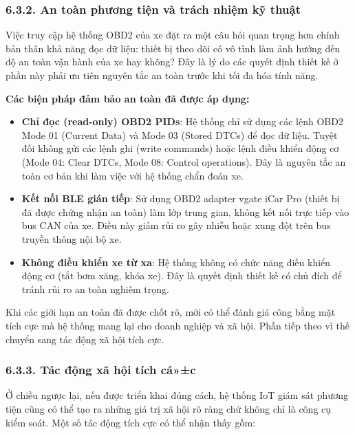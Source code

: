 \documentclass[a4paper]{extarticle}
\providecommand{\tightlist}{%
  \setlength{\itemsep}{0pt}\setlength{\parskip}{0pt}}
\begin{document}
\subsubsection{6.3.2. An toàn phương tiện và trách nhiệm kỹ
thuật}\label{632-an-touxe0n-phux1b0ux1a1ng-tiux1ec7n-vuxe0-truxe1ch-nhiux1ec7m-kux1ef9-thuux1eadt}

Việc truy cập hệ thống OBD2 của xe đặt ra một câu hỏi quan trọng hơn
chính bản thân khả năng đọc dữ liệu: thiết bị theo dõi có vô tình làm
ảnh hưởng đến độ an toàn vận hành của xe hay không? Đây là lý do các
quyết định thiết kế ở phần này phải ưu tiên nguyên tắc an toàn trước khi
tối đa hóa tính năng.

\textbf{Các biện pháp đảm bảo an toàn đã được áp dụng:}

\begin{itemize}
\tightlist
\item
  \textbf{Chỉ đọc (read-only) OBD2 PIDs}: Hệ thống chỉ sử dụng các lệnh
  OBD2 Mode 01 (Current Data) và Mode 03 (Stored DTCs) để đọc dữ liệu.
  Tuyệt đối không gửi các lệnh ghi (write commands) hoặc lệnh điều khiển
  động cơ (Mode 04: Clear DTCs, Mode 08: Control operations). Đây là
  nguyên tắc an toàn cơ bản khi làm việc với hệ thống chẩn đoán xe.
\item
  \textbf{Kết nối BLE gián tiếp}: Sử dụng OBD2 adapter vgate iCar Pro
  (thiết bị đã được chứng nhận an toàn) làm lớp trung gian, không kết
  nối trực tiếp vào bus CAN của xe. Điều này giảm rủi ro gây nhiễu hoặc
  xung đột trên bus truyền thông nội bộ xe.
\item
  \textbf{Không điều khiển xe từ xa}: Hệ thống không có chức năng điều
  khiển động cơ (tắt bơm xăng, khóa xe). Đây là quyết định thiết kế có
  chủ đích để tránh rủi ro an toàn nghiêm trọng.
\end{itemize}

Khi các giới hạn an toàn đã được chốt rõ, mới có thể đánh giá công bằng
mặt tích cực mà hệ thống mang lại cho doanh nghiệp và xã hội. Phần tiếp
theo vì thế chuyển sang tác động xã hội tích cực.

\subsubsection{6.3.3. Tác động xã hội tích
cá»±c}\label{633-tuxe1c-ux111ux1ed9ng-xuxe3-hux1ed9i-tuxedch-cux1ef1c}

Ở chiều ngược lại, nếu được triển khai đúng cách, hệ thống IoT giám sát
phương tiện cũng có thể tạo ra những giá trị xã hội rõ ràng chứ không
chỉ là công cụ kiểm soát. Một số tác động tích cực có thể nhận thấy gồm:
\end{document}
